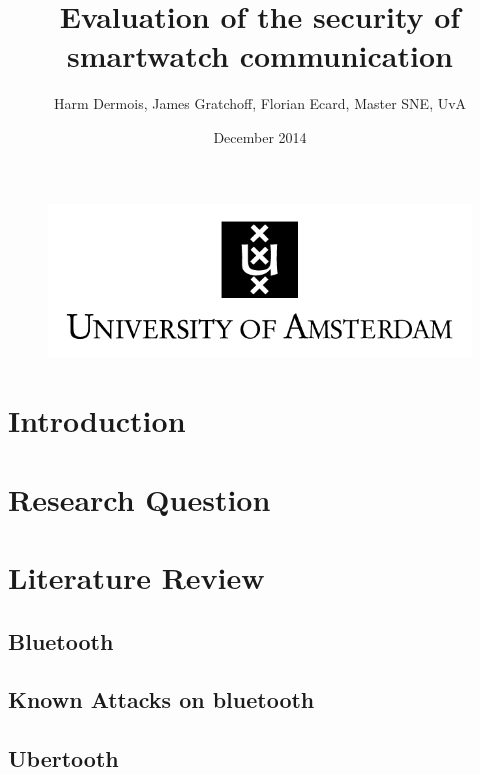 \documentclass{article}
\begin{document}
 

\begin{figure}[!bh]
 	\begin{center}
		\huge \title{Evaluation of the security of smartwatch communication}
		\author{Harm Dermois, James Gratchoff, Florian Ecard,  Master SNE, UvA} 
		\date{December 2014\\}
	\maketitle 
		\includegraphics{uva.jpeg}
		\label{sec:uva}
	\end{center}
\end{figure}

\newpage

\tableofcontents

\newpage

\section{Introduction}

\section{Research Question}

\section{Literature Review}

	\subsection{Bluetooth}
	
	\subsection{Known Attacks on bluetooth}
	
	\subsection{Ubertooth}
	
\end{document}
